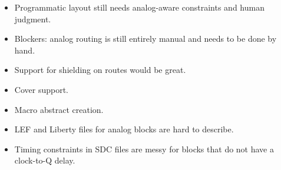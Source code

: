 \begin{frame}
{\begin{itemize}
    \item Programmatic layout still needs analog-aware constraints and human judgment.
    \item Blockers: analog routing is still entirely manual and needs to be done by hand.
    \item Support for shielding on routes would be great.
    \item Cover support.
    \item Macro abstract creation.
    \item LEF and Liberty files for analog blocks are hard to describe.
    \item Timing constraints in SDC files are messy for blocks that do not have a clock-to-Q delay.
  \end{itemize}}
\end{frame}

